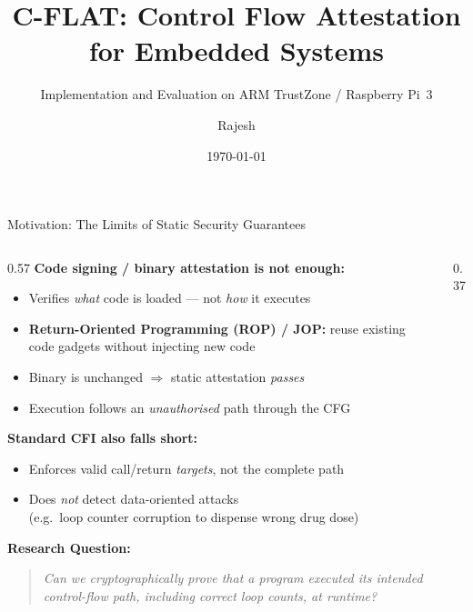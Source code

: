 \documentclass[aspectratio=169]{beamer}
\title[C-FLAT on ARM TrustZone]
      {C-FLAT: Control Flow Attestation for Embedded Systems}
\subtitle{Implementation and Evaluation on ARM TrustZone / Raspberry Pi~3}
\author{Rajesh}
\institute{}
\date{\today}
\begin{document}
\begin{frame}
  \titlepage
\end{frame}

\begin{frame}{Motivation: The Limits of Static Security Guarantees}
\begin{columns}[T]

\begin{column}{0.57\textwidth}
  \textbf{Code signing / binary attestation is not enough:}
  \begin{itemize}
    \item Verifies \emph{what} code is loaded — not \emph{how} it executes
    \item \textbf{Return-Oriented Programming (ROP) / JOP:} reuse existing code
          gadgets without injecting new code
    \item Binary is unchanged $\Rightarrow$ static attestation \emph{passes}
    \item Execution follows an \emph{unauthorised} path through the CFG
  \end{itemize}

  \bigskip
  \textbf{Standard CFI also falls short:}
  \begin{itemize}
    \item Enforces valid call/return \emph{targets}, not the complete path
    \item Does \emph{not} detect data-oriented attacks \\
          (e.g.\ loop counter corruption to dispense wrong drug dose)
  \end{itemize}

  \bigskip
  \textbf{Research Question:}
  \begin{quote}
    \itshape Can we cryptographically prove that a program executed its
    intended control-flow path, including correct loop counts, at runtime?
  \end{quote}
\end{column}

\begin{column}{0.37\textwidth}
  \centering
\end{column}
\end{columns}
\end{frame}
\end{document}
